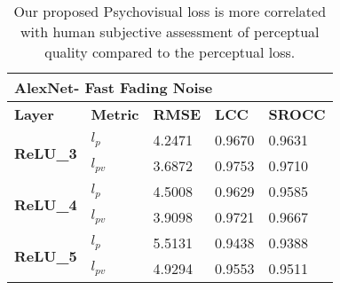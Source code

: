 \documentclass[10pt,twocolumn,letterpaper]{article}
\begin{document}
\begin{table}[]
\caption{Our proposed Psychovisual loss is more correlated with human subjective assessment of perceptual quality compared to the perceptual loss.}
\begin{tabular}{|l|l|l|l|l|}
\hline
\multicolumn{5}{|l|}{\textbf{AlexNet- Fast Fading Noise}}                                           \\ \hline
\textbf{Layer}                    & \textbf{Metric} & \textbf{RMSE} & \textbf{LCC} & \textbf{SROCC} \\ \hline
\multirow{2}{*}{\textbf{ReLU\_3}} & \textbf{$l_{p}$}              & 4.2471        & 0.9670       & 0.9631         \\ \cline{2-5}
                                  & \textbf{$l_{pv}$}             & 3.6872        & 0.9753       & 0.9710         \\ \hline
\multirow{2}{*}{\textbf{ReLU\_4}} & \textbf{$l_{p}$}              & 4.5008        & 0.9629       & 0.9585         \\ \cline{2-5}
                                  & \textbf{$l_{pv}$}             & 3.9098        & 0.9721       & 0.9667         \\ \hline
\multirow{2}{*}{\textbf{ReLU\_5}} & \textbf{$l_{p}$}              & 5.5131        & 0.9438       & 0.9388         \\ \cline{2-5}
                                  & \textbf{$l_{pv}$}            & 4.9294        & 0.9553       & 0.9511         \\ \hline
\end{tabular}
\end{table}
\end{document}

